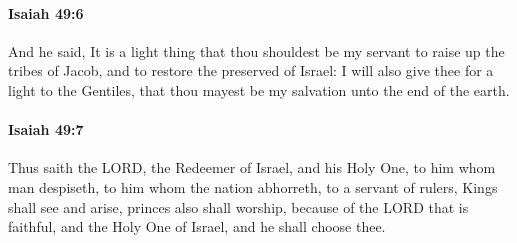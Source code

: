 		\paragraph{Isaiah 49:6} %
			\label{ISAIAH-49-6}

			And he said, It is a light thing that thou shouldest be my servant to raise up the tribes of Jacob, and to restore the preserved of Israel: I will also give thee for a light to the Gentiles, that thou mayest be my salvation unto the end of the earth.


		\paragraph{Isaiah 49:7} %
			\label{ISAIAH-49-7}

			Thus saith the LORD, the Redeemer of Israel, and his Holy One, to him whom man despiseth, to him whom the nation abhorreth, to a servant of rulers, Kings shall see and arise, princes also shall worship, because of the LORD that is faithful, and the Holy One of Israel, and he shall choose thee.

